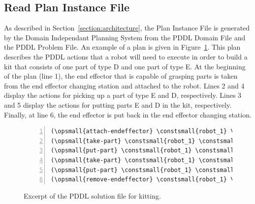 \subsection{Read Plan Instance File}
As described in Section~\ref{section:architecture}, the \textsf{Plan Instance File} is generated by the \textsf{Domain Independant Planning System} from the \textsf{PDDL Domain File} and the \textsf{PDDL Problem File}. An example of a plan is given in Figure~\ref{fig:Solution}. This plan describes the PDDL actions that a robot will need to execute in order to build a kit that consists of one part of type D and one part of type E. At the beginning of the plan (line 1), the end effector that is capable of grasping parts is taken from the end effector changing station and attached to the robot. Lines 2 and 4 display the actions for picking up a part of type E and D, respectively. Lines 3 and 5 display the actions for putting parts E and D in the kit, respectively. Finally, at line 6, the end effector is put back in the end effector changing station.
\begin{figure}[t!h!]
\begin{minipage}{.5\paperwidth}
\begin{list}{}{\setlength{\leftmargin}{0em}}\item\small
\begin{Verbatim}[commandchars=\\\{\},fontsize=\normalsize, numbers=left, numbersep=0pt]
(\opsmall{attach-endeffector} \constsmall{robot_1} \constsmall{part_gripper} \constsmall{part_gripper_holder} \constsmall{changing_station_1})
(\opsmall{take-part} \constsmall{robot_1} \constsmall{part_e1} \constsmall{ptr_e} \constsmall{part_gripper})
(\opsmall{put-part} \constsmall{robot_1} \constsmall{part_e1} \constsmall{kit_a2b3c3d1e1} \constsmall{work_table_1} \constsmall{ptr_e})
(\opsmall{take-part} \constsmall{robot_1} \constsmall{part_d1} \constsmall{ptr_d} \constsmall{part_gripper})
(\opsmall{put-part} \constsmall{robot_1} \constsmall{part_d1} \constsmall{kit_a2b3c3d1e1} \constsmall{work_table_1} \constsmall{ptr_d})
(\opsmall{remove-endeffector} \constsmall{robot_1} \constsmall{part_gripper} \constsmall{part_gripper_holder} \constsmall{changing_station_1})
\end{Verbatim}
\end{list}
\end{minipage}
\caption{Excerpt of the PDDL solution file for kitting.}
\label{fig:Solution}
\end{figure}


